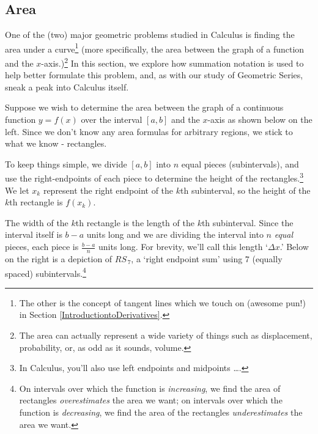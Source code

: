 \subsection{Area}
\label{AreabySum}

One of the (two) major geometric problems studied in Calculus is finding the area under a curve\footnote{The other is the concept of tangent lines which we touch on (awesome pun!) in Section \ref{IntroductiontoDerivatives}.}  (more specifically, the area between the graph of a function and the $x$-axis.)\footnote{The area can actually represent a wide variety of things such as displacement, probability, or, as odd as it sounds, volume.}  In this section, we explore how summation notation is used to help better formulate this problem, and, as with our study of Geometric Series, sneak a peak into Calculus itself.

\medskip

Suppose we wish to determine the area between the graph of a continuous function $y = f(x)$  over the interval  $[a,b]$ and the $x$-axis as shown below on the left.  Since we don't know any area formulas for arbitrary regions, we stick to what we know - rectangles.  

\medskip

To keep things simple, we  divide $[a,b]$ into $n$ equal pieces (subintervals), and use the right-endpoints of each piece to determine the height of the rectangles.\footnote{In Calculus, you'll also use left endpoints and midpoints \ldots.}  We let $x_{k}$ represent the right endpoint of the $k$th subinterval, so the height of the $k$th rectangle is $f(x_{k})$.  

\medskip

The width of the $k$th rectangle is the length of the $k$th subinterval.  Since the interval itself is $b-a$ units long and we are dividing the interval into $n$ \textit{equal} pieces, each piece is $\frac{b-a}{n}$  units long.  For brevity, we'll call this length  `$\Delta x$.'   Below on the right is a depiction of $RS_{\, 7}$, a `right endpoint sum' using $7$ (equally spaced) subintervals.\footnote{On intervals over which the function is \textit{increasing}, we find the area of rectangles \textit{overestimates} the area we want;  on intervals over which the function is \textit{decreasing}, we find the area of the rectangles \textit{underestimates} the area we want.}

